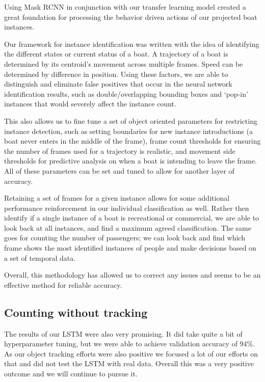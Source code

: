 \documentclass[10pt,twocolumn,letterpaper]{article}
\begin{document}
Using Mask RCNN in conjunction with our transfer learning model created a great foundation for processing the behavior driven actions of our projected boat instances.  

Our framework for instance identification was written with the idea of identifying the different states or current status of a boat.  A trajectory of a boat is determined by its centroid's movement across multiple frames.  Speed can be determined by difference in position.  Using these factors, we are able to distinguish and eliminate false positives that occur in the neural network identification results, such as double/overlapping bounding boxes and `pop-in' instances that would severely affect the instance count.

This also allows us to fine tune a set of object oriented parameters for restricting instance detection, such as setting boundaries for new instance introductions (a boat never enters in the middle of the frame), frame count thresholds for ensuring the number of frames used for a trajectory is realistic, and movement side thresholds for predictive analysis on when a boat is intending to leave the frame.  All of these parameters can be set and tuned to allow for another layer of accuracy.

Retaining a set of frames for a given instance allows for some additional performance reinforcement in our individual classification as well.  Rather then identify if a single instance of a boat is recreational or commercial, we are able to look back at all instances, and find a maximum agreed classification.  The same goes for counting the number of passengers; we can look back and find which frame shows the most identified instances of people and make decisions based on a set of temporal data.

Overall, this methodology has allowed us to correct any issues and seems to be an effective method for reliable accuracy.

\subsection{Counting without tracking}

The results of our LSTM were also very promising. It did take quite a bit of hyperparameter tuning, but we were able to achieve validation accuracy of 94\%. As our object tracking efforts were also positive we focused a lot of our efforts on that and did not test the LSTM with real data. Overall this was a very positive outcome and we will continue to pursue it.
\end{document}
